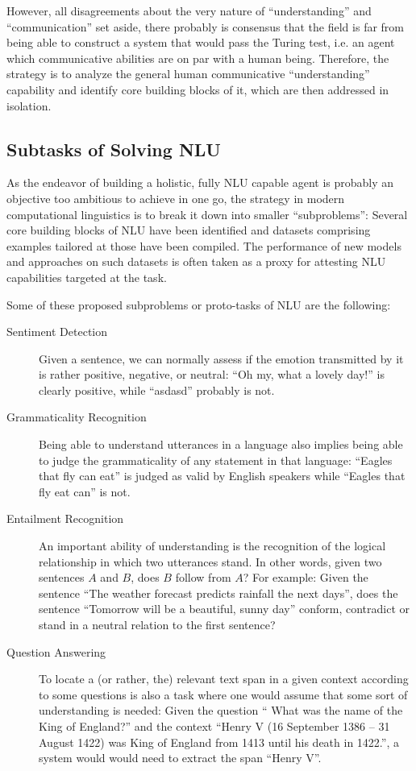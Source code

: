 However, all disagreements about the very nature of ``understanding'' and ``communication'' set aside,
there probably is consensus that the field is far from being able to construct a system that
would pass the Turing test, i.e. an agent which communicative abilities are on par with a human being.
Therefore, the strategy is to analyze the general human communicative ``understanding'' capability
and identify core building blocks of it, which are then addressed in isolation.



\subsection{Subtasks of Solving NLU}

As the endeavor of building a holistic, fully NLU capable agent is probably an objective
too ambitious to achieve in one go, the strategy in modern computational linguistics is
to break it down into smaller ``subproblems'': Several core building blocks of NLU have
been identified and datasets comprising examples tailored at those have been compiled.
The performance of new models and approaches on such datasets is often taken as a proxy
for attesting NLU capabilities targeted at the task.

Some of these proposed subproblems or proto-tasks of NLU are the following:

\begin{description}
  \item[Sentiment Detection] Given a sentence, we can normally assess if the emotion transmitted by
      it is rather positive, negative, or neutral: ``Oh my, what a lovely day!'' is clearly positive,
      while  ``asdasd'' probably is not.
  \item[Grammaticality Recognition] Being able to understand utterances in a language also implies
      being able to judge the grammaticality of any statement in that language: ``Eagles that fly can
      eat'' is judged as valid by English speakers while ``Eagles that fly eat can'' is not.
  \item[Entailment Recognition] An important ability of understanding is the recognition of the
      logical relationship in which two utterances stand. In other words, given two sentences $A$ and
      $B$, does $B$ follow from $A$? For example: Given the sentence ``The weather forecast predicts
      rainfall the next days'', does the sentence ``Tomorrow will be a beautiful, sunny day'' conform,
      contradict or stand in a neutral relation to the first sentence?
  \item[Question Answering] To locate a (or rather, the) relevant text span in a given context according to some
      questions is also a task where one would assume that some sort of understanding is needed:
      Given the question `` What was the name of the King of England?'' and the context ``Henry
      V (16 September 1386 – 31 August 1422) was King of England from 1413 until his death in
      1422.'', a system would would need to extract the span ``Henry V''.
\end{description}

